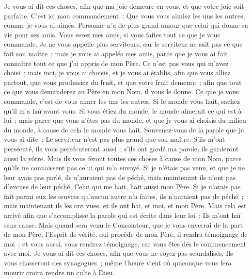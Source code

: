 \begin{multicols}{2}
Je vous ai dit ces choses, afin que ma joie demeure en vous, et que votre joie soit parfaite.
C'est ici mon commandement~: Que vous vous aimiez les uns les autres, comme je vous ai aimés.
Personne n'a de plus grand amour que celui qui donne sa vie pour ses amis.
Vous serez mes amis, si vous faites tout ce que je vous commande.
Je ne vous appelle plus serviteurs, car le serviteur ne sait pas ce que fait son maître~; mais je vous ai appelés mes amis, parce que je vous ai fait connaître tout ce que j'ai appris de mon Père.
Ce n'est pas vous qui m'avez choisi~; mais moi, je vous ai choisis, et je vous ai établis, afin que vous alliez partout, que vous produisiez du fruit, et que votre fruit demeure~; afin que tout ce que vous demanderez au Père en mon Nom, il vous le donne.
Ce que je vous commande, c'est de vous aimer les uns les autres.
Si le monde vous hait, sachez qu'il m'a haï avant vous.
Si vous étiez du monde, le monde aimerait ce qui est à lui~; mais parce que vous n'êtes pas du monde, et que je vous ai choisis du milieu du monde, à cause de cela le monde vous hait.
Souvenez-vous de la parole que je vous ai dite~: Le serviteur n'est pas plus grand que son maître. S'ils m'ont persécuté, ils vous persécuteront aussi~; s'ils ont gardé ma parole, ils garderont aussi la vôtre.
Mais ils vous feront toutes ces choses à cause de mon Nom, parce qu'ils ne connaissent pas celui qui m'a envoyé.
Si je n'étais pas venu, et que je ne leur avais pas parlé, ils n'auraient pas de péché, mais maintenant ils n'ont pas d'excuse de leur péché.
Celui qui me hait, hait aussi mon Père.
Si je n'avais pas fait parmi eux les œuvres qu'aucun autre n'a faites, ils n'auraient pas de péché~; mais maintenant ils les ont vues, et ils ont haï, et moi, et mon Père.
Mais cela est arrivé afin que s'accomplisse la parole qui est écrite dans leur loi~: Ils m'ont haï sans cause.
Mais quand sera venu le Consolateur, que je vous enverrai de la part de mon Père, l'Esprit de vérité, qui procède de mon Père, il rendra témoignage de moi~;
et vous aussi, vous rendrez témoignage, car vous êtes dès le commencement avec moi.
\VerseOne{}Je vous ai dit ces choses, afin que vous ne soyez pas scandalisés.
Ils vous chasseront des synagogues~; même l'heure vient où quiconque vous fera mourir croira rendre un culte à Dieu.

\end{multicols}
